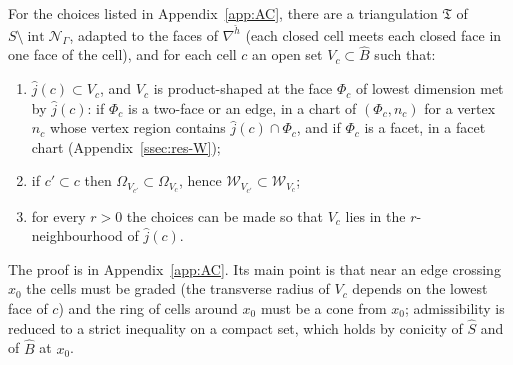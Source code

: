 \begin{lemma}\label{lem:AC}
For the choices listed in Appendix~\ref{app:AC}, there are a triangulation $\mathfrak T$ of $S\setminus\operatorname{int}\mathcal
N_\Gamma$, adapted to the faces of $\nabla^{\check h}$ (each closed cell meets each closed face in one face of the cell), and for
each cell $c$ an open set $V_c\subset\widehat B$ such that:
\begin{enumerate}
\item $\hat j(c)\subset V_c$, and $V_c$ is product-shaped at the face $\Phi_c$ of lowest dimension met by $\hat j(c)$: if
$\Phi_c$ is a two-face or an edge, in a chart of $(\Phi_c,n_c)$ for a vertex $n_c$ whose vertex region contains
$\hat j(c)\cap\Phi_c$, and if $\Phi_c$ is a facet, in a facet chart (Appendix~\ref{ssec:res-W});
\item if $c'\subset c$ then $\Omega_{V_{c'}}\subset\Omega_{V_c}$, hence $\mathscr W_{V_{c'}}\subset \mathscr W_{V_c}$;
\item for every $r>0$ the choices can be made so that $V_c$ lies in the $r$-neighbourhood of $\hat j(c)$.
\end{enumerate}
\end{lemma}
The proof is in Appendix~\ref{app:AC}. Its main point is that near an edge crossing $x_0$ the cells must be graded (the
transverse radius of $V_c$ depends on the lowest face of $c$) and the ring of cells around $x_0$ must be a cone from $x_0$;
admissibility is reduced to a strict inequality on a compact set, which holds by conicity of $\hat S$ and of $\widehat B$ at
$x_0$.

